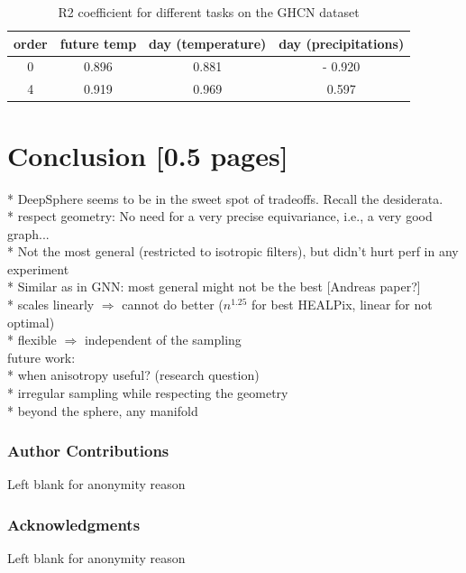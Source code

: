 \documentclass{article} %
\begin{document}
\begin{table}
    \centering
    \begin{tabular}{c|ccc}
        order & future temp & day (temperature) & day (precipitations) \\ \hline
        0 & 0.896 & 0.881 & - 0.920\\
        4 & 0.919 & 0.969 & 0.597\\
    \end{tabular}
    \caption{R2 coefficient for different tasks on the GHCN dataset}
    \label{tab:GHCN_results}
\end{table}



\section{Conclusion [0.5 pages]}

* DeepSphere seems to be in the sweet spot of tradeoffs. Recall the desiderata.\\
  * respect geometry: No need for a very precise equivariance, i.e., a very good graph...\\
  * Not the most general (restricted to isotropic filters), but didn't hurt perf in any experiment\\
  * Similar as in GNN: most general might not be the best [Andreas paper?] \\
  * scales linearly $\Rightarrow$ cannot do better ($n^{1.25}$ for best HEALPix, linear for not optimal)\\
  * flexible $\Rightarrow$ independent of the sampling\\

future work:\\
* when anisotropy useful? (research question)\\
* irregular sampling while respecting the geometry\\
* beyond the sphere, any manifold\\

\newpage
\subsubsection*{Author Contributions}
Left blank for anonymity reason

\subsubsection*{Acknowledgments}
Left blank for anonymity reason
\end{document}
